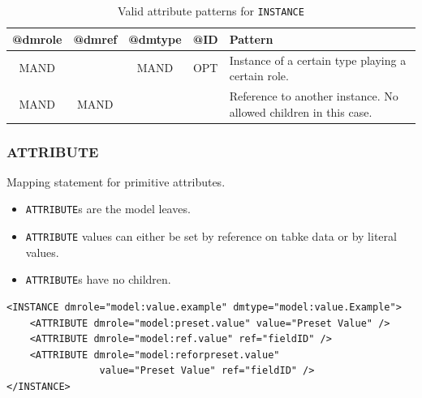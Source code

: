 \documentclass[11pt,a4paper]{ivoa}
\begin{document}
\begin{table}[!htbp]
\small
\centering
\begin{tabulary}{\linewidth}{|c|c|c|c|J|}
    \hline 
        \textbf{@dmrole} & 
        \textbf{@dmref} &  
        \textbf{@dmtype} &  
        \textbf{@ID} &  
        \textbf{Pattern}\\
    \hline      \hline  
        MAND &   
       & 
       MAND & 
       OPT & 
       Instance of a certain type playing a certain role. \\
    \hline  
       MAND  & 
       MAND  &  
       &  
       & 
       Reference to another instance. 
        \newline  No allowed children in this case.  \\
      \hline 
\end{tabulary}
     \caption{Valid attribute patterns for  \texttt{INSTANCE}} 
     \label{tbl:inst-pattern}
 \end{table}
\FloatBarrier
%
%

\subsubsection{ATTRIBUTE}

Mapping statement for primitive attributes.

\begin{itemize}
    \item \texttt{ATTRIBUTE}s  are the model leaves.     
    \item \texttt{ATTRIBUTE}  values can either be set by reference on tabke data or by literal values. 
    \item \texttt{ATTRIBUTE}s have no children.
\end{itemize}

\begin{lstlisting}[caption={ATTRIBUTE examples},style=XML]
<INSTANCE dmrole="model:value.example" dmtype="model:value.Example">
    <ATTRIBUTE dmrole="model:preset.value" value="Preset Value" />    
    <ATTRIBUTE dmrole="model:ref.value" ref="fieldID" />    
    <ATTRIBUTE dmrole="model:reforpreset.value" 
                value="Preset Value" ref="fieldID" />
</INSTANCE>
\end{lstlisting}
\end{document}
